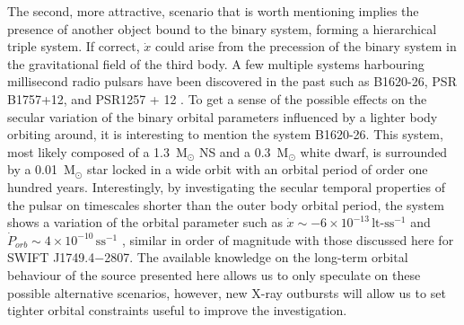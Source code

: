 \documentclass[fleqn,usenatbib]{mnras}
\newcommand{\swiftj}{SWIFT J1749.4$-$2807}
\begin{document}
The second, more attractive, scenario that is worth mentioning implies the presence of another object bound to the binary system, forming a hierarchical triple system. If correct, $\dot{x}$ could arise from the precession of the binary system in the gravitational field of the third body. A few multiple systems harbouring millisecond radio pulsars have been discovered in the past such as B1620-26, PSR B1757+12, and PSR1257 + 12 \citep[see e.g.,][]{Thorsett:1999vo, Wolszczan:1992wd, Ransom:2014vb}. To get a sense of the possible effects on the secular variation of the binary orbital parameters influenced by a lighter body orbiting around, it is interesting to mention the system B1620-26. This system, most likely composed of a 1.3~M$_\odot$ NS and a 0.3~M$_\odot$ white dwarf, is surrounded by a 0.01~M$_\odot$ star locked in a wide orbit with an orbital period of order one hundred years. Interestingly, by investigating the secular temporal properties of the pulsar on timescales shorter than the outer body orbital period, the system shows a variation of the orbital parameter such as $\dot{x}\sim -6\times 10^{-13}\,\text{lt-s}\text{s}^{-1}$ and $\dot{P}_{orb}\sim4\times 10^{-10}\,\text{s}\text{s}^{-1}$ \citep{Thorsett:1999vo}, similar in order of magnitude with those discussed here for \swiftj{}. The available knowledge on the long-term orbital behaviour of the source presented here allows us to only speculate on these possible alternative scenarios, however, new X-ray outbursts will allow us to set tighter orbital constraints useful to improve the investigation.    
\end{document}
